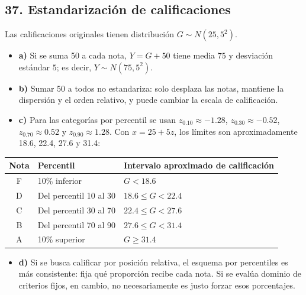 \documentclass[11pt]{article}
\begin{document}
\clearpage
\subsection*{37. Estandarización de calificaciones}
Las calificaciones originales tienen distribución $G\sim N(25,5^2)$.
\begin{itemize}
  \item \textbf{a)} Si se suma 50 a cada nota, $Y=G+50$ tiene media $75$ y desviación estándar $5$; es decir, $Y\sim N(75,5^2)$.
  \item \textbf{b)} Sumar 50 a todos no estandariza: solo desplaza las notas, mantiene la dispersión y el orden relativo, y puede cambiar la escala de calificación.
  \item \textbf{c)} Para las categorías por percentil se usan $z_{0.10}\approx-1.28$, $z_{0.30}\approx-0.52$, $z_{0.70}\approx0.52$ y $z_{0.90}\approx1.28$. Con $x=25+5z$, los límites son aproximadamente 18.6, 22.4, 27.6 y 31.4:
\end{itemize}
\begin{center}
\small
\begin{tabular}{c l l}
\toprule
Nota & Percentil & Intervalo aproximado de calificación \\
\midrule
F & 10\% inferior & $G<18.6$ \\
D & Del percentil 10 al 30 & $18.6\le G<22.4$ \\
C & Del percentil 30 al 70 & $22.4\le G<27.6$ \\
B & Del percentil 70 al 90 & $27.6\le G<31.4$ \\
A & 10\% superior & $G\ge31.4$ \\
\bottomrule
\end{tabular}
\end{center}
\begin{itemize}
  \item \textbf{d)} Si se busca calificar por posición relativa, el esquema por percentiles es más consistente: fija qué proporción recibe cada nota. Si se evalúa dominio de criterios fijos, en cambio, no necesariamente es justo forzar esos porcentajes.
\end{itemize}

\endgroup
\end{document}
